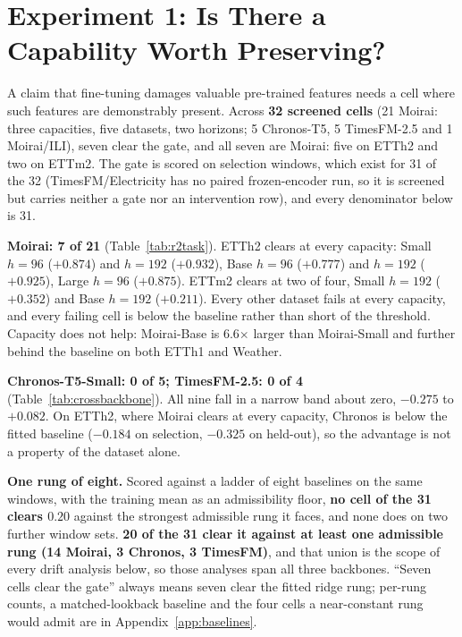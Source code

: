 \section{Experiment 1: Is There a Capability Worth Preserving?}
\label{sec:forecasting}
\label{sec:forecasting:gate}

A claim that fine-tuning damages valuable pre-trained features needs a cell where
such features are demonstrably present.  Across \textbf{32 screened
cells} (21 Moirai: three capacities, five datasets, two horizons; 5
Chronos-T5, 5 TimesFM-2.5 and 1 Moirai/ILI), seven clear the gate, and all seven
are Moirai: five on ETTh2 and two on ETTm2.  The gate is scored on selection
windows, which exist for 31 of the 32 (TimesFM/Electricity has no paired
frozen-encoder run, so it is screened but carries neither a gate nor an
intervention row), and every denominator below is 31.

\textbf{Moirai: 7 of 21} (Table~\ref{tab:r2task}).  ETTh2 clears at every
capacity: Small $h{=}96$ ($+0.874$) and $h{=}192$ ($+0.932$), Base $h{=}96$
($+0.777$) and $h{=}192$ ($+0.925$), Large $h{=}96$ ($+0.875$).  ETTm2 clears
at two of four, Small $h{=}192$ ($+0.352$) and Base $h{=}192$ ($+0.211$).
Every other dataset fails at every capacity, and every failing cell is below the
baseline rather than short of the threshold.  Capacity does not help: Moirai-Base
is 6.6$\times$ larger than Moirai-Small and further behind the baseline on both
ETTh1 and Weather.

\textbf{Chronos-T5-Small: 0 of 5; TimesFM-2.5: 0 of 4}
(Table~\ref{tab:crossbackbone}).  All nine fall in a narrow band about zero,
$-0.275$ to $+0.082$.  On ETTh2, where Moirai clears at every capacity, Chronos
is below the fitted baseline ($-0.184$ on selection, $-0.325$ on held-out), so
the advantage is not a property of the dataset alone.

\textbf{One rung of eight.}  Scored against a ladder of eight baselines on the
same windows, with the training mean as an admissibility floor, \textbf{no cell of
the 31 clears $0.20$} against the strongest admissible rung it faces, and none
does on two further window sets.  \textbf{20 of the 31 clear it against at
least one admissible rung (14 Moirai, 3 Chronos, 3 TimesFM)}, and that union is
the scope of every drift analysis below, so those analyses span all three
backbones.  ``Seven cells clear the gate'' always means seven clear the fitted
ridge rung; per-rung counts, a matched-lookback baseline and the four cells a
near-constant rung would admit are in Appendix~\ref{app:baselines}.


